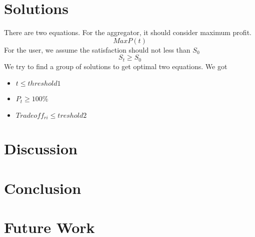 \documentclass[a4paper]{article}
\begin{document}
\section{Solutions}
There are two equations. 
For the aggregator, it should consider maximum profit.
$$Max P(t)$$
For the user, we assume the satisfaction should not less than $S_0$  
$$S_t\geq S_0$$
We try to find a group of solutions to get optimal two equations.
We got 
\begin{itemize}
	\item $t \leq threshold1$
	\item $P_t\geq100\%$
	\item $Tradeoff_{ri}\leq treshold2$
\end{itemize}


\section{Discussion}
\section{Conclusion}
\section{Future Work}
\end{document}
